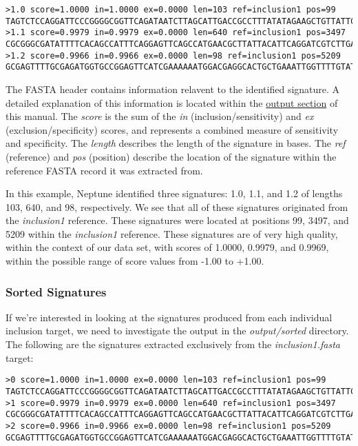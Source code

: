 \documentclass[a4paper,10pt]{article}
\begin{document}
\begin{minipage}{\linewidth}
\begin{lstlisting}[frame=single, style=bash, title=output/consolidated/consolidated.fasta]
>1.0 score=1.0000 in=1.0000 ex=0.0000 len=103 ref=inclusion1 pos=99
TAGTCTCCAGGATTCCCGGGGCGGTTCAGATAATCTTAGCATTGACCGCCTTTATATAGAAGCTGTTATTCAAGAAGCAT...
>1.1 score=0.9979 in=0.9979 ex=0.0000 len=640 ref=inclusion1 pos=3497
CGCGGGCGATATTTTCACAGCCATTTCAGGAGTTCAGCCATGAACGCTTATTACATTCAGGATCGTCTTGAGGCTCAGAG...
>1.2 score=0.9966 in=0.9966 ex=0.0000 len=98 ref=inclusion1 pos=5209
GCGAGTTTTGCGAGATGGTGCCGGAGTTCATCGAAAAAATGGACGAGGCACTGCTGAAATTGGTTTTGTATTTGGGGAGC...
\end{lstlisting}
\end{minipage}

The FASTA header contains information relavent to the identified signature. A detailed explanation of this information is located within the \hyperref[section:output]{output section} of this manual. The \textit{score} is the sum of the \textit{in} (inclusion/sensitivity) and \textit{ex} (exclusion/specificity) scores, and represents a combined measure of sensitivity and specificity. The \textit{length} describes the length of the signature in bases. The \textit{ref} (reference) and \textit{pos} (position) describe the location of the signature within the reference FASTA record it was extracted from.

In this example, Neptune identified three signatures: 1.0, 1.1, and 1.2 of lengths 103, 640, and 98, respectively. We see that all of these signatures originated from the \textit{inclusion1} reference. These signatures were located at positions 99, 3497, and 5209 within the \textit{inclusion1} reference. These signatures are of very high quality, within the context of our data set, with scores of 1.0000, 0.9979, and 0.9969, within the possible range of score values from -1.00 to +1.00.

\subsubsection{Sorted Signatures}

If we're interested in looking at the signatures produced from each individual inclusion target, we need to investigate the output in the \textit{output/sorted} directory. The following are the signatures extracted exclusively from the \textit{inclusion1.fasta} target:

\begin{minipage}{\linewidth}
\begin{lstlisting}[frame=single, style=bash, title=output/sorted/inclusion1.fasta]
>0 score=1.0000 in=1.0000 ex=0.0000 len=103 ref=inclusion1 pos=99
TAGTCTCCAGGATTCCCGGGGCGGTTCAGATAATCTTAGCATTGACCGCCTTTATATAGAAGCTGTTATTCAAGAAGCAT...
>1 score=0.9979 in=0.9979 ex=0.0000 len=640 ref=inclusion1 pos=3497
CGCGGGCGATATTTTCACAGCCATTTCAGGAGTTCAGCCATGAACGCTTATTACATTCAGGATCGTCTTGAGGCTCAGAG...
>2 score=0.9966 in=0.9966 ex=0.0000 len=98 ref=inclusion1 pos=5209
GCGAGTTTTGCGAGATGGTGCCGGAGTTCATCGAAAAAATGGACGAGGCACTGCTGAAATTGGTTTTGTATTTGGGGAGC...
\end{lstlisting}
\end{minipage}
\end{document}
